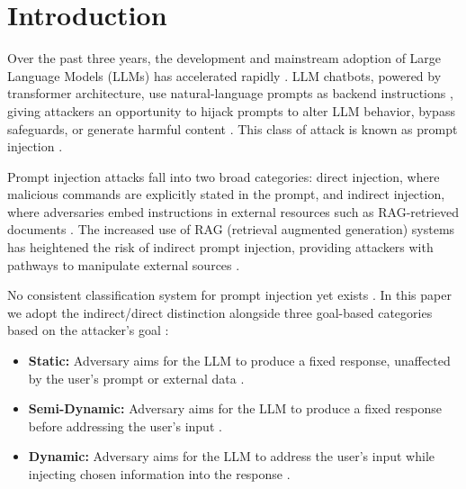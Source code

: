 \documentclass[12pt, letterpaper]{article}   %
\def\reporttitlelinespacing{1.0}   %
\begin{document}
\begin{titlepage}
\begin{tabularx}{\textwidth}{|c|X|X|l|}
       
        
    \end{tabularx}
    
\end{titlepage}
\setcounter{page}{2}

\newpage
\begingroup
\setstretch{\reporttitlelinespacing}
\tableofcontents
\endgroup
\newpage


\section{Introduction}

Over the past three years, the development and mainstream adoption of Large Language Models (LLMs) has accelerated rapidly \cite{ref24}. LLM chatbots, powered by transformer architecture, use natural-language prompts as backend instructions \cite{ref7}\cite{ref24}, giving attackers an opportunity to hijack prompts to alter LLM behavior, bypass safeguards, or generate harmful content \cite{ref3}\cite{ref40}\cite{ref24}\cite{ref39}\cite{ref9}. This class of attack is known as prompt injection \cite{ref14}.

Prompt injection attacks fall into two broad categories: direct injection, where malicious commands are explicitly stated in the prompt, and indirect injection, where adversaries embed instructions in external resources such as RAG-retrieved documents \cite{ref35}\cite{ref34}\cite{ref9}. The increased use of RAG (retrieval augmented generation) systems has heightened the risk of indirect prompt injection, providing attackers with pathways to manipulate external sources \cite{ref16}\cite{ref9}\cite{ref4}.

No consistent classification system for prompt injection yet exists \cite{ref40}\cite{ref19}\cite{ref14}. In this paper we adopt the indirect/direct distinction alongside three goal-based categories based on the attacker's goal \cite{ref40}:

\begin{itemize}
    \item \textbf{Static:} Adversary aims for the LLM to produce a fixed response, unaffected by the user's prompt or external data \cite{ref40}.
    \item \textbf{Semi-Dynamic:} Adversary aims for the LLM to produce a fixed response before addressing the user's input \cite{ref40}.
    \item \textbf{Dynamic:} Adversary aims for the LLM to address the user's input while injecting chosen information into the response \cite{ref40}.
\end{itemize}
\end{document}
